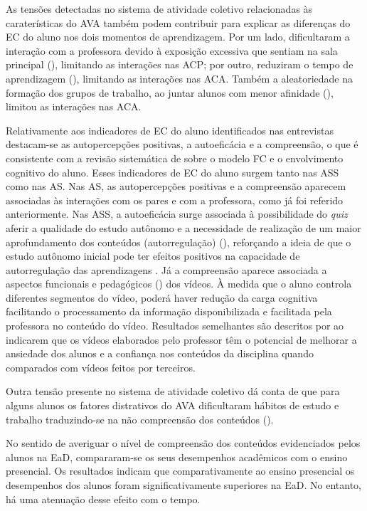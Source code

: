 \documentclass[portuguese]{textolivre}
\begin{document}
As tensões detectadas no sistema de atividade coletivo relacionadas às caraterísticas do AVA também podem contribuir para explicar as diferenças do EC do aluno nos dois momentos de aprendizagem. Por um lado, dificultaram a interação com a professora devido à exposição excessiva que sentiam na sala principal (), limitando as interações nas ACP; por outro, reduziram o tempo de aprendizagem (), limitando as interações nas ACA. Também a aleatoriedade na formação dos grupos de trabalho, ao juntar alunos com menor afinidade (), limitou as interações nas ACA. 

Relativamente aos indicadores de EC do aluno identificados nas entrevistas destacam-se as autopercepções positivas, a autoeficácia e a compreensão, o que é consistente com a revisão sistemática de \textcite{bond_facilitating_2020} sobre o modelo FC e o envolvimento cognitivo do aluno. Esses indicadores de EC do aluno surgem tanto nas ASS como nas AS. Nas AS, as autopercepções positivas e a compreensão aparecem associadas às interações com os pares e com a professora, como já foi referido anteriormente. Nas ASS, a autoeficácia surge associada à possibilidade do \textit{quiz} aferir a qualidade do estudo autônomo e a necessidade de realização de um maior aprofundamento dos conteúdos (autorregulação) (), reforçando a ideia de que o estudo autônomo inicial pode ter efeitos positivos na capacidade de autorregulação das aprendizagens \cite{bond_facilitating_2020}. Já a compreensão aparece associada a aspectos funcionais e pedagógicos () dos vídeos. À medida que o aluno controla diferentes segmentos do vídeo, poderá haver redução da carga cognitiva facilitando o processamento da informação disponibilizada \cite{clark_efficiency_2006} e facilitada pela professora no conteúdo do vídeo. Resultados semelhantes são descritos por \textcite{dove_flipping_2017} ao indicarem que os vídeos elaborados pelo professor têm o potencial de melhorar a ansiedade dos alunos e a confiança nos conteúdos da disciplina quando comparados com vídeos feitos por terceiros. 

Outra tensão presente no sistema de atividade coletivo dá conta de que para alguns alunos os fatores distrativos do AVA dificultaram hábitos de estudo e trabalho traduzindo-se na não compreensão dos conteúdos (). 

No sentido de averiguar o nível de compreensão dos conteúdos evidenciados pelos alunos na EaD, compararam-se os seus desempenhos acadêmicos com o ensino presencial. Os resultados indicam que comparativamente ao ensino presencial os desempenhos dos alunos foram significativamente superiores na EaD. No entanto, há uma atenuação desse efeito com o tempo. 
\end{document}
